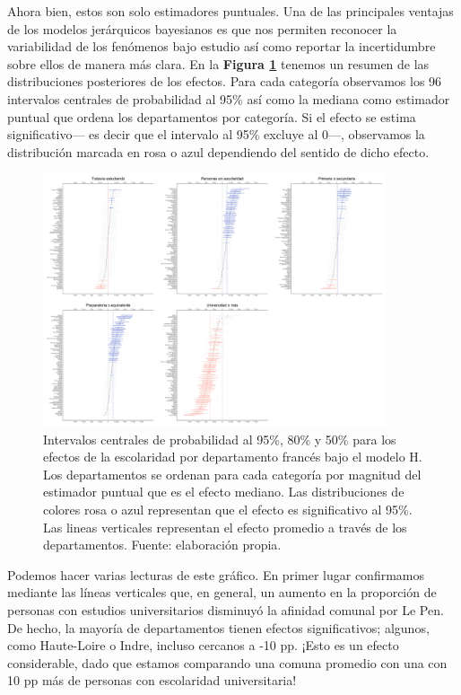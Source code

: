 Ahora bien, estos son solo estimadores puntuales. Una de las principales ventajas de los modelos jerárquicos bayesianos es que nos permiten reconocer la variabilidad de los fenómenos bajo estudio así como reportar la incertidumbre sobre ellos de manera más clara. En la \textbf{Figura \ref{fig:Efectos_Escolaridad}} tenemos un resumen de las distribuciones posteriores de los efectos. Para cada categoría observamos los 96 intervalos centrales de probabilidad al 95\% así como la mediana como estimador puntual que ordena los departamentos por categoría. Si el efecto se estima significativo--- es decir que el intervalo al 95\% excluye al 0---, observamos la distribución marcada en rosa o azul dependiendo del sentido de dicho efecto.\\

\begin{figure}
	\centering
	\includegraphics[width = 0.9\textwidth]{Figs/Efectos/Efectos_Escolaridad_Modelo_H}
	\caption{Intervalos centrales de probabilidad al 95\%, 80\% y 50\% para los efectos de la escolaridad por departamento francés bajo el modelo H. Los departamentos se ordenan para cada categoría por magnitud del estimador puntual que es el efecto mediano. Las distribuciones de colores rosa o azul representan que el efecto es significativo al 95\%. Las lineas verticales representan el efecto promedio a través de los departamentos. Fuente: elaboración propia.}
	\label{fig:Efectos_Escolaridad}
\end{figure}

Podemos hacer varias lecturas de este gráfico. En primer lugar confirmamos mediante las líneas verticales que, en general, un aumento en la proporción de personas con estudios universitarios disminuyó la afinidad comunal por Le Pen. De hecho, la mayoría de departamentos tienen efectos significativos; algunos, como Haute-Loire o Indre, incluso cercanos a -10 pp. ¡Esto es un efecto considerable, dado que estamos comparando una comuna promedio con una con 10 pp más de personas con escolaridad universitaria!\\

